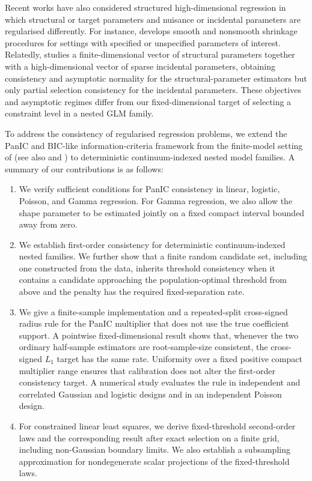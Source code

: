 \documentclass[12pt]{article}
\newenvironment{bluechange}{\begingroup\color[rgb]{0.00,0.00,1.00}}{\endgroup}
\theoremstyle{remark}
\theoremstyle{plain}
\begin{document}
\begin{bluechange}
Recent works have also considered structured high-dimensional regression in which structural or target parameters and nuisance or incidental parameters are regularised differently. For instance, \citet{drikvandi2025} develops smooth and nonsmooth shrinkage procedures for settings with specified or unspecified parameters of interest. Relatedly, \citet{fan_tang_shi_2018} studies a finite-dimensional vector of structural parameters together with a high-dimensional vector of sparse incidental parameters, obtaining consistency and asymptotic normality for the structural-parameter estimators but only partial selection consistency for the incidental parameters. These objectives and asymptotic regimes differ from our fixed-dimensional target of selecting a constraint level in a nested GLM family.

To address the consistency of regularised regression problems, we extend the PanIC and BIC-like information-criteria framework from the finite-model setting of \cite{nguyen_panic:_2023} (see also \citealp{pmlr-v235-westerhout24a} and \citealp{HoNguyen2025VariableSelectionThresholding}) to deterministic continuum-indexed nested model families. A summary of our contributions is as follows:
\begin{enumerate}
    \item We verify sufficient conditions for PanIC consistency in linear, logistic, Poisson, and Gamma regression. For Gamma regression, we also allow the shape parameter to be estimated jointly on a fixed compact interval bounded away from zero.
    \item We establish first-order consistency for deterministic continuum-indexed nested families. We further show that a finite random candidate set, including one constructed from the data, inherits threshold consistency when it contains a candidate approaching the population-optimal threshold from above and the penalty has the required fixed-separation rate.
    \item We give a finite-sample implementation and a repeated-split cross-signed radius rule for the PanIC multiplier that does not use the true coefficient support. A pointwise fixed-dimensional result shows that, whenever the two ordinary half-sample estimators are root-sample-size consistent, the cross-signed $L_1$ target has the same rate. Uniformity over a fixed positive compact multiplier range ensures that calibration does not alter the first-order consistency target. A numerical study evaluates the rule in independent and correlated Gaussian and logistic designs and in an independent Poisson design.
    \item For constrained linear least squares, we derive fixed-threshold second-order laws and the corresponding result after exact selection on a finite grid, including non-Gaussian boundary limits. We also establish a subsampling approximation for nondegenerate scalar projections of the fixed-threshold laws.
\end{enumerate}
\end{bluechange}
\end{document}
